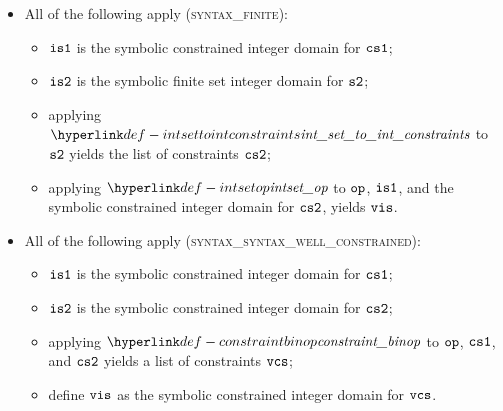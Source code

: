 \begin{itemize}
  \item All of the following apply (\textsc{syntax\_finite}):
  \begin{itemize}
    \item $\visone$ is the symbolic constrained integer domain for $\csone$;
    \item $\vistwo$ is the symbolic finite set integer domain for $\vstwo$;
    \item applying $\intsettointconstraints$ to $\vstwo$ yields the list of constraints $\cstwo$;
    \item applying $\intsetop$ to $\op$, $\visone$, and the symbolic constrained integer domain
          for $\cstwo$, yields $\vis$.
  \end{itemize}

  \item All of the following apply (\textsc{syntax\_syntax\_well\_constrained}):
  \begin{itemize}
    \item $\visone$ is the symbolic constrained integer domain for $\csone$;
    \item $\vistwo$ is the symbolic constrained integer domain for $\cstwo$;
    \item applying $\constraintbinop$ to $\op$, $\csone$, and $\cstwo$ yields
          a list of constraints $\vcs$;
    \item define $\vis$ as the symbolic constrained integer domain for $\vcs$.
  \end{itemize}
\end{itemize}

\FormallyParagraph
{}

\begin{mathpar}
\end{mathpar}


